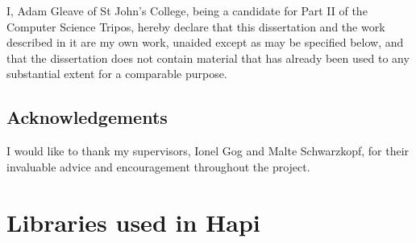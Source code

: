 \documentclass[12pt,a4paper,twoside,notitlepage]{report}
\theoremstyle{plain}
\theoremstyle{definition}
\theoremstyle{remark}
\begin{document}
I, Adam Gleave of St John's College, being a candidate for Part II of the 
Computer Science Tripos, hereby declare that this dissertation and the work 
described in it are my own work, unaided except as may be specified below, and
that the dissertation does not contain material that has already been used to
any substantial extent for a comparable purpose.

\bigskip
{}
\medskip

\clearpage

\tableofcontents

\listofalgorithms
\listoftables
\listoffigures

\newpage
\section*{Acknowledgements}

I would like to thank my supervisors, Ionel Gog and Malte Schwarzkopf, for their invaluable advice and encouragement throughout the project.

\clearpage	%

\setcounter{page}{1}
\pagestyle{headings}



\cleardoublepage


\cleardoublepage


\cleardoublepage


\cleardoublepage


\cleardoublepage

\printbibliography[heading=bibintoc,category=cited]

\printbibliography[title={WARNING: Uncited},notcategory=cited]


\appendix
\chapter{Libraries used in Hapi} \label{appendix:tools-libraries}

\end{document}

